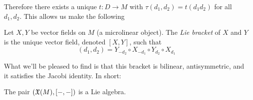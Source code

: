 Therefore there exists a unique \( t:D\to M \) with \( \tau(d_1,d_2) = t(d_1d_2) \) for all \( d_1,d_2 \). This allows us make the following

\begin{defn}
  Let \( X,Y \) be vector fields on \( M \) (a microlinear object). The \emph{Lie bracket} of \( X \) and \( Y \) is the unique vector field, denoted \( [X,Y] \), such that
  \begin{equation*}
    [X,Y](d_1,d_2) = Y_{-d_2}\circ X_{-d_1}\circ Y_{d_2}\circ X_{d_1}
  \end{equation*}
\end{defn}

What we'll be pleased to find is that this bracket is bilinear, antisymmetric, and it satisfies the Jacobi identity. In short:

\begin{proposition}
  The pair \( (\mathfrak X(M), [-,-]) \) is a Lie algebra.
\end{proposition}

